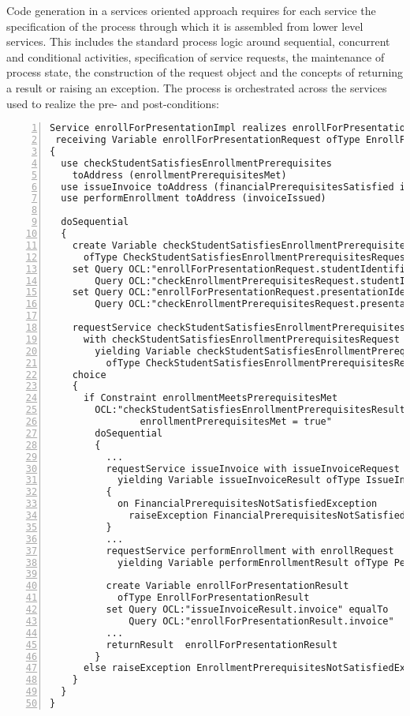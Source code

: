 Code generation in a services oriented approach requires for each service the specification of the process through which it is assembled from lower level services. This includes the standard process logic around sequential, concurrent and conditional activities, specification of service requests, the maintenance of process state, the construction of the request object and the concepts of returning a result or raising an exception. The process is orchestrated across the services used to realize the pre- and post-conditions:
\tiny \begin{lstlisting}[numbers=left,escapechar=|]
Service enrollForPresentationImpl realizes enrollForPresentation 
 receiving Variable enrollForPresentationRequest ofType EnrollForPresentationRequest
{
  use checkStudentSatisfiesEnrollmentPrerequisites 
    toAddress (enrollmentPrerequisitesMet)
  use issueInvoice toAddress (financialPrerequisitesSatisfied invoiceIssued) 
  use performEnrollment toAddress (invoiceIssued)
   
  doSequential
  {
    create Variable checkStudentSatisfiesEnrollmentPrerequisitesRequest 
      ofType CheckStudentSatisfiesEnrollmentPrerequisitesRequest               
    set Query OCL:"enrollForPresentationRequest.studentIdentifier" equalTo 
        Query OCL:"checkEnrollmentPrerequisitesRequest.studentIdentifier"
    set Query OCL:"enrollForPresentationRequest.presentationIdentifier" equalTo
        Query OCL:"checkEnrollmentPrerequisitesRequest.presentationIdentifier"
                     
    requestService checkStudentSatisfiesEnrollmentPrerequisites 
      with checkStudentSatisfiesEnrollmentPrerequisitesRequest 
        yielding Variable checkStudentSatisfiesEnrollmentPrerequisitesResult
          ofType CheckStudentSatisfiesEnrollmentPrerequisitesResult
    choice
    {
      if Constraint enrollmentMeetsPrerequisitesMet 
        OCL:"checkStudentSatisfiesEnrollmentPrerequisitesResult.
                enrollmentPrerequisitesMet = true"
        doSequential
        {
          ...
          requestService issueInvoice with issueInvoiceRequest 
            yielding Variable issueInvoiceResult ofType IssueInvoiceResult
          {
            on FinancialPrerequisitesNotSatisfiedException 
              raiseException FinancialPrerequisitesNotSatisfiedException
          }
	      ...
          requestService performEnrollment with enrollRequest 
            yielding Variable performEnrollmentResult ofType PerformEnrollmentResult
          
          create Variable enrollForPresentationResult 
            ofType EnrollForPresentationResult
          set Query OCL:"issueInvoiceResult.invoice" equalTo
              Query OCL:"enrollForPresentationResult.invoice"
          ...                       
          returnResult  enrollForPresentationResult
        }
      else raiseException EnrollmentPrerequisitesNotSatisfiedException
    }
  }
}                 
\end{lstlisting}\normalsize
